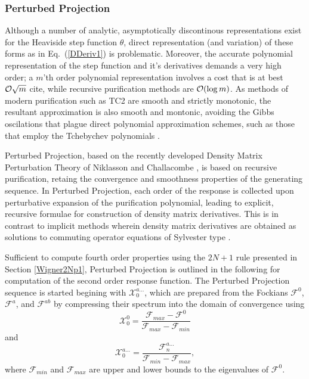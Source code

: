 \documentclass[prl,aps,letterpaper,twocolumn,showpacs,twocolumngrid,superbib]{revtex4}
\def\F{\mathcal{F}}
\def\X{\mathcal{X}}
\begin{document}
\newpage

\subsubsection{Perturbed Projection}\label{ResponseFunctions}

Although a number of analytic, asymptotically discontinous representations exist for the Heaviside 
step function $\theta$, direct representation (and variation) of these forms as in Eq.~(\ref{DDeriv1}) 
is problematic.  Moreover, the accurate polynomial representation of the step function and it's 
derivatives demands a very high order;  a $m$'th order polynomial representation involves a 
cost that is at best ${\cal O}\sqrt{m}$ cite{}, while recursive purification methods are 
${\cal O}( \log m )$.  As methods of modern purification such as TC2 are smooth and strictly monotonic, 
the resultant approximation is also smooth and montonic, avoiding the Gibbs oscilations that
plague direct polynomial approximation schemes, such as those that employ the Tchebychev polynomials 
\cite{AFVoter96}.  

Perturbed Projection, based on the recently developed Density Matrix Perturbation Theory of Niklasson and 
Challacombe \cite{ANiklasson04}, is based on recursive purification, retaing the convergence and
smoothness properties of the generating sequence.   In Perturbed Projection, each order of the response 
is collected upon perturbative expansion of the purification polynomial,  leading to explicit, recursive 
formulae for construction of density matrix derivatives.  This is in contrast to implicit methods wherein 
density matrix derivatives are obtained as solutions to commuting operator equations of Sylvester 
type \cite{Ochsenfeld97,Helgaker_2001,COchsenfeld04}.

Sufficient to compute fourth order properties using the $2 N+1$ rule presented in Section \ref{Wigner2Np1}, 
Perturbed Projection is outlined in the following for computation of the second order response function.  
The Perturbed Projection sequence is started begining with $\X^{a\ldots}_{0}$, which are 
prepared from the Fockians $\F^0$, $\F^a$, and $\F^{ab}$ by  compressing their spectrum into the domain of 
convergence \cite{ANiklasson02A} using
\begin{equation}
    \X^0_{0}=\frac{\F_{max}-\F^0}{\F_{max}-\F_{min}} 
\end{equation}
and 
\begin{equation}
    \X^{a\ldots}_{0}=\frac{\F^{a\ldots}_{n}}{\F_{min}-\F_{max}},
\end{equation}
where $\F_{min}$ and $\F_{max}$ are upper and lower bounds to the eigenvalues of $\F^0$.  
\end{document}
